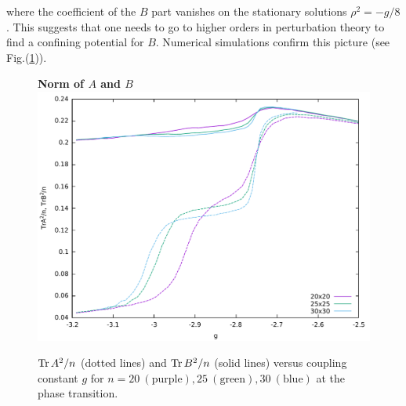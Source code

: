 where the coefficient of the $B$ part vanishes on the stationary solutions $\rho^2 = -g/8$. This suggests that one needs to go to higher orders in perturbation theory to find a confining potential for $B$. Numerical simulations confirm this picture (see Fig.(\ref{fig:ab})). 
\begin{figure}[hp]
\centering
\textbf{Norm of $A$ and $B$}
\includegraphics[width=1\linewidth]{fig/ab.pdf}
\caption{$\operatorname{Tr} A^2/n$ (dotted lines) and $\operatorname{Tr} B^2/n$ (solid lines) versus coupling constant $g$ for $n = 20 \ (\text{purple}), 25 \ (\text{green}), 30 \ (\text{blue})$ at the phase transition.}
\label{fig:ab}
\end{figure}